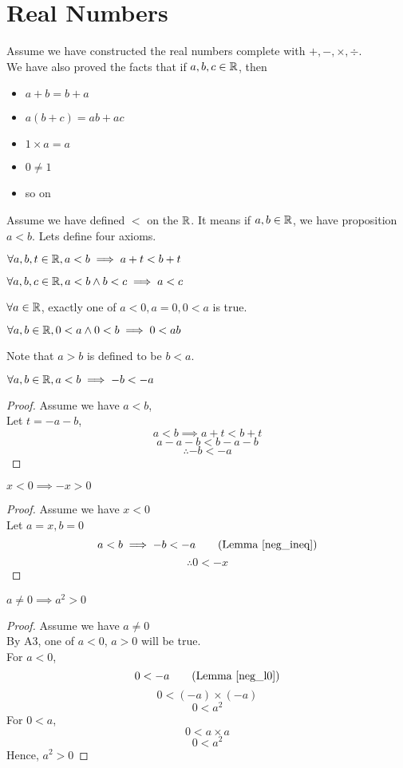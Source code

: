 \documentclass[a4paper]{article}
\begin{document}
\section{Real Numbers}
Assume we have constructed the real numbers complete with $+, -, \times, \div$.\\
We have also proved the facts that if $a,b,c \in \mathbb{R}$, then
\begin{itemize}
	\item $a + b = b + a$
	\item $a(b+c) = ab + ac$
	\item $1 \times a = a$
	\item $0 \neq 1$
	\item so on
\end{itemize}
Assume we have defined $<$ on the $\mathbb{R}$. It means if $a,b \in \mathbb{R}$, we have proposition $a < b$. Lets define four axioms.
\begin{axiom}[A1]\label{A1}
$\forall a, b, t \in \mathbb{R}, a < b \implies a + t < b + t$
\end{axiom}
\begin{axiom}[A2]\label{A2}
$\forall a, b, c \in \mathbb{R}, a < b \land b < c \implies a < c$
\end{axiom}
\begin{axiom}[A3]\label{A3}
$\forall a \in \mathbb{R}$, exactly one of $a<0, a=0, 0<a$ is true.
\end{axiom}
\begin{axiom}[A4]\label{A4}
$\forall a, b \in \mathbb{R}, 0 < a \land 0 < b \implies 0 < ab$
\end{axiom}
\begin{notation}
Note that $a > b$ is defined to be $b < a$.
\end{notation}

\begin{nlemma}\label{neg_ineq}
$\forall a, b \in \mathbb{R}, a < b \implies -b < -a$
\end{nlemma}
\begin{proof}
Assume we have $a < b$,\\
Let $t = -a-b$,
\[
a < b \implies a + t < b + t \tag{A1}
\]
\[
a - a - b < b - a - b
\]
\[
\therefore -b < -a
\]
\end{proof}
\begin{nlemma}\label{neg_l0}
$x < 0 \implies -x > 0$
\end{nlemma}
\begin{proof}
Assume we have $x < 0$\\
Let $a = x, b = 0$\\
\[
a < b \implies -b < -a \tag{Lemma~\ref{neg_ineq}}
\]
\[
\therefore 0 < -x
\]
\end{proof}
\begin{nlemma}\label{Squre_g0}
$a \neq 0 \implies a^2 > 0$
\end{nlemma}
\begin{proof}
Assume we have $a \neq 0$\\
By A3, one of $a < 0$, $a > 0$ will be true.\\
For $a < 0$,
\[
	0 < -a \tag{Lemma~\ref{neg_l0}}
\]
\[
	0 < (-a) \times (-a) \tag{A4}
\]
\[
	0 < a^2
\]
For $0 < a$,
\[
	0 < a \times a \tag{A4}
\]
\[
	0 < a ^2
\]
Hence, $a^2 > 0$
\end{proof}
\end{document}
